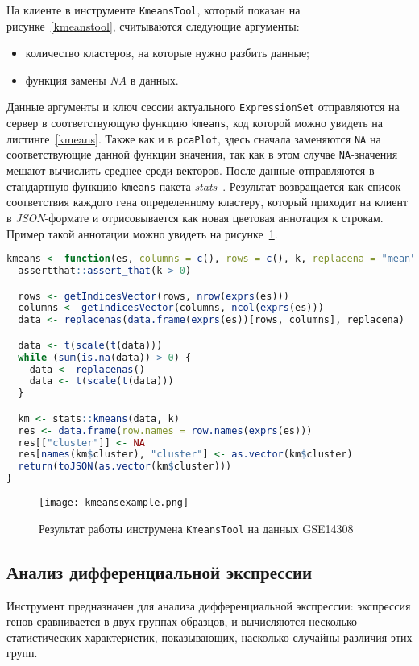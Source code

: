 На клиенте в инструменте \texttt{KmeansTool}, который показан на рисунке~\ref{kmeanstool}, считываются следующие аргументы:
\begin{itemize}
\item количество кластеров, на которые нужно разбить данные;
\item функция замены \emph{NA} в данных.
\end{itemize}

Данные аргументы и ключ сессии актуального \texttt{ExpressionSet} отправляются на сервер в соответствующую функцию \texttt{kmeans}, код которой можно увидеть на листинге~\ref{kmeans}. Также как и в \texttt{pcaPlot}, здесь сначала заменяются \texttt{NA} на соответствующие данной функции значения, так как в этом случае \texttt{NA}-значения мешают вычислить среднее среди векторов. После данные отправляются в стандартную функцию \texttt{kmeans} пакета \emph{stats}~\cite{stats}. Результат возвращается как список соответствия каждого гена определенному кластеру, который приходит на клиент в \emph{JSON}-формате и отрисовывается как новая цветовая аннотация к строкам. Пример такой аннотации можно увидеть на рисунке~\ref{kmeansexample}.

\begin{lstlisting}[float=!h,caption={Кластеризация методом kmeans},label={kmeans},language=R]
kmeans <- function(es, columns = c(), rows = c(), k, replacena = "mean") {
  assertthat::assert_that(k > 0)

  rows <- getIndicesVector(rows, nrow(exprs(es)))
  columns <- getIndicesVector(columns, ncol(exprs(es)))
  data <- replacenas(data.frame(exprs(es))[rows, columns], replacena)

  data <- t(scale(t(data)))
  while (sum(is.na(data)) > 0) {
    data <- replacenas()
    data <- t(scale(t(data)))
  }

  km <- stats::kmeans(data, k)
  res <- data.frame(row.names = row.names(exprs(es)))
  res[["cluster"]] <- NA
  res[names(km$cluster), "cluster"] <- as.vector(km$cluster)
  return(toJSON(as.vector(km$cluster)))
}
\end{lstlisting}

\begin{figure}[h]
  \caption{Результат работы инструмена \texttt{KmeansTool} на данных GSE14308}
  \texttt{[image: kmeansexample.png]}
  \label{kmeansexample}
\end{figure}

\subsection{Анализ дифференциальной экспрессии}
Инструмент предназначен для анализа дифференциальной экспрессии: экспрессия генов сравнивается в двух группах образцов, и вычисляются несколько статистических характеристик, показывающих, насколько случайны различия этих групп.

